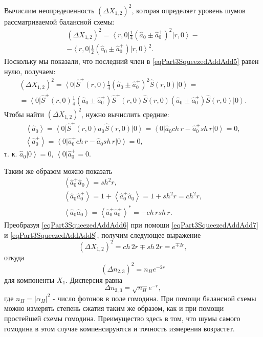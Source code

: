 Вычислим неопределенность $\left(\Delta X_{1,2}\right)^2$, которая
определяет уровень шумов рассматриваемой балансной схемы:
\begin{eqnarray}
\left(\Delta X_{1,2}\right)^2 = 
\left<r,
0\right|\frac{1}{4}\left(\hat{a}_0\pm\hat{a}_0^{+}\right)^2\left|r,
0\right> -
\nonumber \\
-
\left<r,
0\right|\frac{1}{2}\left(\hat{a}_0\pm\hat{a}_0^{+}\right)\left|r,
0\right>^2.
\label{eqPart3SqueezedAddAdd5}
\end{eqnarray}
Поскольку мы показали, что последний член в
\eqref{eqPart3SqueezedAddAdd5} равен нулю, получаем:
\begin{eqnarray}
\left(\Delta X_{1,2}\right)^2 = 
\left<0\right|\hat{S}^{+}\left(r, 0\right)
\frac{1}{4}\left(\hat{a}_0\pm\hat{a}_0^{+}\right)^2
\hat{S}\left(r, 0\right)
\left|0\right> = 
\nonumber \\
=
\left<0\right|\hat{S}^{+}\left(r, 0\right)
\frac{1}{4}
\left(\hat{a}_0\pm\hat{a}_0^{+}\right)
\hat{S}^{+}\left(r, 0\right)
\hat{S}\left(r, 0\right)
\left(\hat{a}_0\pm\hat{a}_0^{+}\right)
\hat{S}\left(r, 0\right)
\left|0\right>.
\label{eqPart3SqueezedAddAdd6}
\end{eqnarray}
Чтобы найти 
$\left(\Delta X_{1,2}\right)^2$, нужно вычислить средние:
\begin{eqnarray}
\left<\hat{a}_0\right> = 
\left<0\right|
\hat{S}^{+}\left(r, 0\right)
\hat{a}_0
\hat{S}\left(r, 0\right)
\left|0\right> = 
\left<0\right|
\hat{a}_0 ch\,r - \hat{a}_0^{+} sh\,r
\left|0\right> = 0,
\nonumber \\
\left<\hat{a}_0^{+}\right> = 
\left<0\right|
\hat{a}_0^{+} ch\,r - \hat{a}_0 sh\,r
\left|0\right> = 0,
\label{eqPart3SqueezedAddAdd7}
\end{eqnarray}
т. к. $\hat{a}_0\left|0\right> = 0$, 
$\left<0\right|\hat{a}_0^{+} = 0$.

Таким же образом можно показать
\begin{eqnarray}
\left<\hat{a}_0^{+}\hat{a}_0\right> = sh^2 r,
\nonumber \\
\left<\hat{a}_0\hat{a}_0^{+}\right> = 
1 + \left<\hat{a}_0^{+}\hat{a}_0\right> =
1 + sh^2 r = ch^2 r,
\nonumber \\
\left<\hat{a}_0\hat{a}_0\right> = 
\left<\hat{a}_0^{+}\hat{a}_0^{+}\right>^{*} = - ch\,r sh\,r.
\label{eqPart3SqueezedAddAdd8}
\end{eqnarray}
Преобразуя \eqref{eqPart3SqueezedAddAdd6} при помощи
\eqref{eqPart3SqueezedAddAdd7} 
и
\eqref{eqPart3SqueezedAddAdd8},
получим следующее выражение
\begin{equation}
\left(\Delta X_{1,2}\right)^2 = 
ch\,2 r \mp sh\, 2 r = 
e^{\mp 2 r},
\nonumber
\end{equation}
откуда
\begin{equation}
\left(\Delta n_{2,3}\right)^2 = 
n_H
e^{- 2 r}
\nonumber
\end{equation}
для компоненты $X_1$. Дисперсия равна 
\[
\Delta n_{2,3} = 
\sqrt{n_H}
e^{- r},
\]
где $n_H=\left|\alpha_H\right|^2$ - число фотонов в поле гомодина.
При помощи балансной схемы можно измерять степень сжатия таким же
образом, как и при помощи простейшей схемы гомодина. Преимущество
здесь в том, что шумы самого гомодина в этом случае компенсируются и
точность измерения возрастет.


